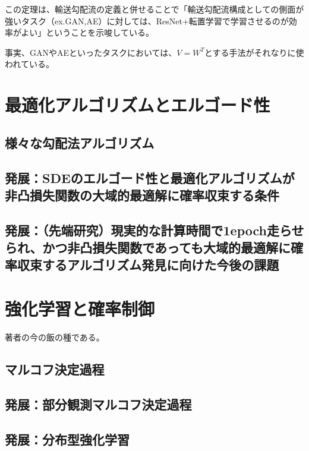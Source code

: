 \documentclass{jsarticle}
\begin{document}
この定理は、輸送勾配流の定義と併せることで「輸送勾配流構成としての側面が強いタスク（ex.GAN,AE）に対しては、ResNet+転置学習で学習させるのが効率がよい」ということを示唆している。

事実、GANやAEといったタスクにおいては、$V=W^T$とする手法がそれなりに使われている。




\newpage
\section{最適化アルゴリズムとエルゴード性}

\subsection{様々な勾配法アルゴリズム}



\subsection{発展：SDEのエルゴード性と最適化アルゴリズムが非凸損失関数の大域的最適解に確率収束する条件}


\subsection{発展：（先端研究）現実的な計算時間で1epoch走らせられ、かつ非凸損失関数であっても大域的最適解に確率収束するアルゴリズム発見に向けた今後の課題}

\newpage

\section{強化学習と確率制御}
著者の今の飯の種である。
\subsection{マルコフ決定過程}



\subsection{発展：部分観測マルコフ決定過程}




\subsection{発展：分布型強化学習}
\end{document}

